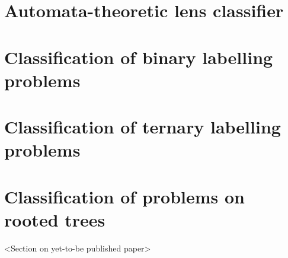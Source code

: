\section{Automata-theoretic lens classifier}

\section{Classification of binary labelling problems}

\section{Classification of ternary labelling problems}

\section{Classification of problems on rooted trees}

<Section on yet-to-be published paper>

